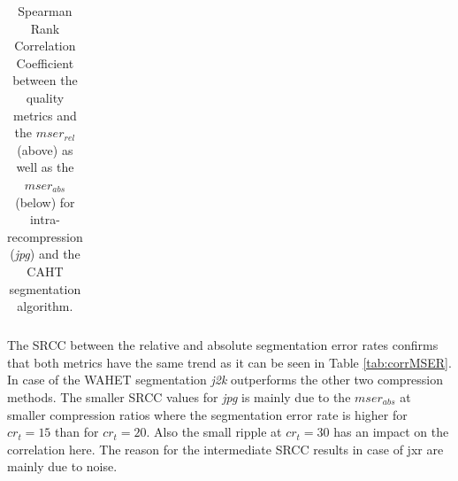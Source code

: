 \documentclass[10pt,twocolumn,letterpaper]{article}
\begin{document}
\begin{table}
\begin{tabular}{ | l || l | l | l | l | l | }
\end{tabular}
\caption{Spearman Rank Correlation Coefficient between the quality metrics and the $mser_{rel}$ (above) as well as the $mser_{abs}$ (below) for intra-recompression (\emph{jpg}) and the CAHT segmentation algorithm.}
\label{tab:corrJPG}
\end{table}



The SRCC between the relative and absolute segmentation error rates confirms that both metrics have the same trend as it can be seen in Table \ref{tab:corrMSER}. In case of the WAHET segmentation \emph{j2k} outperforms the other two compression methods. The smaller SRCC values for \emph{jpg} is mainly due to the $mser_{abs}$ at smaller compression ratios where the segmentation error rate is higher for $cr_t = 15$ than for $cr_t = 20$. Also the small ripple at $cr_t = 30$ has an impact on the correlation here.
The reason for the intermediate SRCC results in case of jxr are mainly due to noise. %
\end{document}

